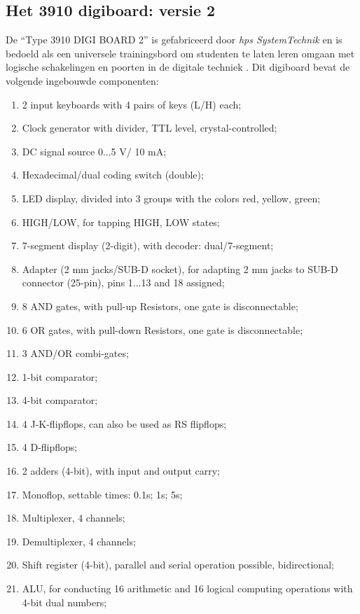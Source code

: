 \documentclass[12pt]{article}
\begin{document}
\subsection{Het 3910 digiboard: versie 2}
De ``Type 3910 DIGI BOARD 2'' is gefabriceerd door \textit{hps SystemTechnik} en is bedoeld als een universele trainingsbord om studenten te laten leren omgaan met logische schakelingen en poorten in de digitale techniek \cite{hps-systemtechnik}. 
Dit digiboard bevat de volgende ingebouwde componenten: \cite{hps-systemtechnik_ds_DIGI}
\begin{enumerate}
    \item 2 input keyboards with 4 pairs of keys (L/H) each;
    \item Clock generator with divider, TTL level, crystal-controlled;
    \item DC signal source 0...5 V/ 10 mA;
    \item Hexadecimal/dual coding switch (double);
    \item LED display, divided into 3 groups with the colors red, yellow, green;
    \item HIGH/LOW, for tapping HIGH, LOW states;
    \item 7-segment display (2-digit), with decoder: dual/7-segment;
    \item Adapter (2 mm jacks/SUB-D socket), for adapting 2 mm jacks to SUB-D connector (25-pin), pins 1...13 and 18 assigned;
    \item 8 AND gates, with pull-up Resistors, one gate is disconnectable;
    \item 6 OR gates, with pull-down Resistors, one gate is disconnectable;
    \item 3 AND/OR combi-gates;
    \item 1-bit comparator;
    \item 4-bit comparator;
    \item 4 J-K-flipflops, can also be used as RS flipflops;
    \item 4 D-flipflops;
    \item 2 adders (4-bit), with input and output carry;
    \item Monoflop, settable times: 0.1s; 1s; 5s;
    \item Multiplexer, 4 channels;
    \item Demultiplexer, 4 channels;
    \item Shift register (4-bit), parallel and serial operation possible, bidirectional;
    \item ALU, for conducting 16 arithmetic and 16 logical computing operations with 4-bit dual numbers;

\end{enumerate}
\end{document}
